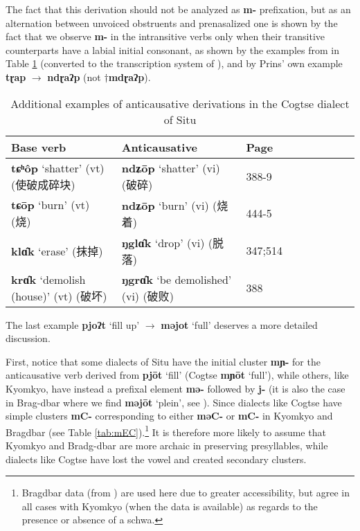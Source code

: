 \documentclass[oneside,a4paper,11pt]{article}
\newcommand{\ipa}[1]{\textbf{{\phon\mbox{#1}}}} %
\newcommand{\zh}[1]{{\cn #1}}
\begin{document}
The fact that this derivation should not be analyzed as \ipa{m-} prefixation, but as an alternation between unvoiced obstruents and prenasalized one is shown by the fact that we observe \ipa{m-} in the intransitive verbs only when their transitive counterparts have a labial initial consonant, as shown by the examples from \citet[193-4]{linxr93jiarong} in Table \ref{tab:anticaus} (converted to the transcription system of \citealt{huangsun02}), and by Prins' own example \ipa{tɽap} $\rightarrow$ \ipa{ndɽaʔp} (not $\dagger$\ipa{mdɽaʔp}).


\begin{table}[h]
\caption{Additional examples of anticausative derivations in the Cogtse dialect of Situ} \label{tab:anticaus} \centering
\begin{tabular}{lllllllll}
\toprule
Base verb &Anticausative &Page \\
\midrule 
\ipa{tɕʰôp} `shatter' (vt) (\zh{使破成碎块}) & \ipa{ndʑōp} `shatter' (vi) (\zh{破碎}) & 388-9 \\
\ipa{tɕōp} `burn' (vt) (\zh{烧}) & \ipa{ndʑōp} `burn' (vi) (\zh{烧着}) & 444-5 \\
\ipa{klɑ̂k} `erase' (\zh{抹掉}) & \ipa{ŋglɑ̂k} `drop' (vi) (\zh{脱落}) & 347;514 \\
\ipa{krɑ̂k} `demolish (house)' (vt) (\zh{破坏}) & \ipa{ŋgrɑ̂k} `be demolished' (vi) (\zh{破败}) & 388 \\
\bottomrule
\end{tabular}
\end{table}

The last example \ipa{pjoʔt} `fill up' $\rightarrow$ \ipa{məjot} `full'  deserves a more detailed discussion. 

First, notice that some dialects of Situ  have the initial cluster \ipa{mɲ-} for the anticausative verb derived from   \ipa{pjōt} `fill' (Cogtse \ipa{mɲōt}  `full'), while others, like Kyomkyo, have instead a prefixal element \ipa{mə-} followed by \ipa{j-} (it is also the case in Brag-dbar where we find \ipa{məjōt} `plein', see \citealt[77]{zhang16bragdbar}). Since dialects like Cogtse have simple clusters \ipa{mC-} corresponding to either \ipa{məC-} or \ipa{mC-} in Kyomkyo and Bragdbar (see Table \ref{tab:mEC}).\footnote{Bragdbar data (from \citealt{zhang16bragdbar}) are used here due to greater accessibility, but agree in all cases with Kyomkyo (when the data is available) as regards to the presence or absence of a schwa. } It is therefore more likely to assume that Kyomkyo and Bradg-dbar are more archaic in preserving presyllables, while dialects like Cogtse have lost the vowel and created secondary clusters.
\end{document}
